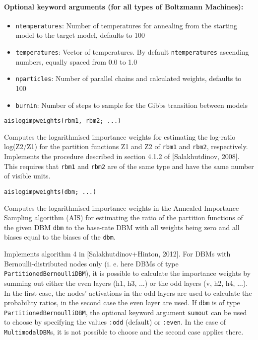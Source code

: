 \paragraph*{Optional keyword arguments (for all types of Boltzmann Machines):}
\begin{itemize}
\item \texttt{ntemperatures}: Number of temperatures for annealing from the starting model to the target model, defaults to 100


\item \texttt{temperatures}: Vector of temperatures. By default \texttt{ntemperatures} ascending numbers, equally spaced from 0.0 to 1.0


\item \texttt{nparticles}: Number of parallel chains and calculated weights, defaults to  100


\item \texttt{burnin}: Number of steps to sample for the Gibbs transition between models

\end{itemize}
\begin{verbatim}
aislogimpweights(rbm1, rbm2; ...)
\end{verbatim}
Computes the logarithmised importance weights for estimating the log-ratio log(Z2/Z1) for the partition functions Z1 and Z2 of \texttt{rbm1} and \texttt{rbm2}, respectively. Implements the procedure described in section 4.1.2 of [Salakhutdinov, 2008]. This requires that \texttt{rbm1} and \texttt{rbm2} are of the same type and have the same number of visible units.

\begin{verbatim}
aislogimpweights(dbm; ...)
\end{verbatim}
Computes the logarithmised importance weights in the Annealed Importance Sampling algorithm (AIS) for estimating the ratio of the partition functions of the given DBM \texttt{dbm} to the base-rate DBM with all weights being zero and all biases equal to the biases of the \texttt{dbm}.

Implements algorithm 4 in [Salakhutdinov+Hinton, 2012]. For DBMs with Bernoulli-distributed nodes only (i. e. here DBMs of type \texttt{PartitionedBernoulliDBM}), it is possible to calculate the importance weights by summing out either the even layers (h1, h3, ...) or the odd layers (v, h2, h4, ...). In the first case, the nodes' activations in the odd layers are used to calculate the probability ratios, in the second case the even layer are used. If \texttt{dbm} is of type \texttt{PartitionedBernoulliDBM}, the optional keyword argument \texttt{sumout} can be used to choose by specifying the values \texttt{:odd} (default) or \texttt{:even}. In the case of \texttt{MultimodalDBM}s, it is not possible to choose and the second case applies there.

